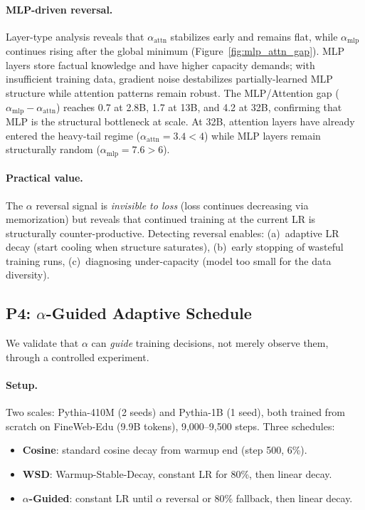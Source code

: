 \paragraph{MLP-driven reversal.}
Layer-type analysis reveals that $\alpha_{\mathrm{attn}}$ stabilizes early and remains flat, while $\alpha_{\mathrm{mlp}}$ continues rising after the global minimum (Figure~\ref{fig:mlp_attn_gap}). MLP layers store factual knowledge and have higher capacity demands; with insufficient training data, gradient noise destabilizes partially-learned MLP structure while attention patterns remain robust. The MLP/Attention gap ($\alpha_{\mathrm{mlp}} - \alpha_{\mathrm{attn}}$) reaches 0.7 at 2.8B, 1.7 at 13B, and 4.2 at 32B, confirming that MLP is the structural bottleneck at scale. At 32B, attention layers have already entered the heavy-tail regime ($\alpha_{\mathrm{attn}} = 3.4 < 4$) while MLP layers remain structurally random ($\alpha_{\mathrm{mlp}} = 7.6 > 6$).

\paragraph{Practical value.} The $\alpha$ reversal signal is \emph{invisible to loss} (loss continues decreasing via memorization) but reveals that continued training at the current LR is structurally counter-productive. Detecting reversal enables:
(a)~adaptive LR decay (start cooling when structure saturates),
(b)~early stopping of wasteful training runs,
(c)~diagnosing under-capacity (model too small for the data diversity).

\subsection{P4: $\alpha$-Guided Adaptive Schedule}
\label{sec:schedule}

We validate that $\alpha$ can \emph{guide} training decisions, not merely observe them, through a controlled experiment.

\paragraph{Setup.} Two scales: Pythia-410M (2 seeds) and Pythia-1B (1 seed), both trained from scratch on FineWeb-Edu (9.9B tokens), 9{,}000--9{,}500 steps. Three schedules:
\begin{itemize}[leftmargin=*,itemsep=0pt]
    \item \textbf{Cosine}: standard cosine decay from warmup end (step 500, 6\%).
    \item \textbf{WSD}: Warmup-Stable-Decay, constant LR for 80\%, then linear decay.
    \item \textbf{$\alpha$-Guided}: constant LR until $\alpha$ reversal or 80\% fallback, then linear decay.
\end{itemize}

